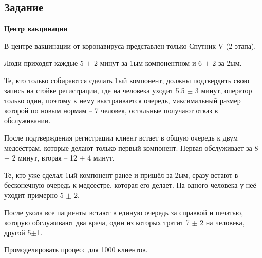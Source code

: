 
\subsection{Задание}
\textbf{Центр вакцинации}
  
В центре вакцинации от коронавируса представлен только Спутник V (2 этапа).

Люди приходят каждые 5 $\pm$ 2 минут за 1ым компонентном и 6 $\pm$ 2 за 2ым. 

Те, кто только собираются сделать 1ый компонент, должны подтвердить свою запись на стойке регистрации, где на человека уходит 5.5 $\pm$ 3 минут, оператор только один, поэтому к нему выстраивается очередь, максимальный размер которой по новым нормам -- 7 человек, остальные получают отказ в обслуживании. 

После подтверждения регистрации клиент встает в общую очередь к двум медсёстрам, которые делают только первый компонент. Первая обслуживает за 8 $\pm$ 2 минут, вторая -- 12 $\pm$ 4 минут. 

Те, кто уже сделал 1ый компонент ранее и пришёл за 2ым, сразу встают в бесконечную очередь к медсестре, которая его делает. На одного человека у неё уходит примерно 5 $\pm$ 2. 

После укола все пациенты встают в единую очередь за справкой и печатью, которую обслуживают два врача, один из которых тратит 7 $\pm$ 2 на человека, другой 5$\pm$1.

Промоделировать процесс для 1000 клиентов.